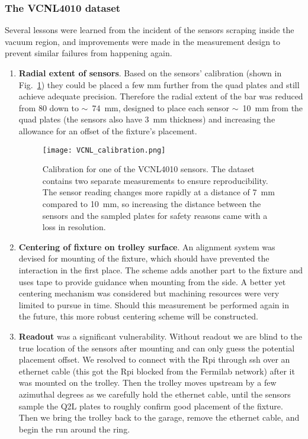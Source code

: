 \subsubsection{\label{sec:VCNL_data} The VCNL4010 dataset}


Several lessons were learned from the incident of the sensors scraping inside the vacuum region, and improvements were made in the measurement design to prevent similar failures from happening again.
\begin{enumerate}
\item \textbf{Radial extent of sensors}. Based on the sensors' calibration (shown in Fig.~\ref{fig:VCNL_calibration}) they could be placed a few mm further from the quad plates and still achieve adequate precision. Therefore the radial extent of the bar was reduced from 80 down to $\sim$~\SI{74}{mm}, designed to place each sensor $\sim$~\SI{10}{mm} from the quad plates (the sensors also have \SI{3}{mm} thickness) and increasing the allowance for an offset of the fixture's placement.


\begin{figure}[]
	\centering
	\texttt{[image: VCNL\_calibration.png]}
	\caption{Calibration for one of the VCNL4010 sensors. The dataset contains two separate measurements to ensure reproducibility. The sensor reading changes more rapidly at a distance of \SI{7}{mm} compared to \SI{10}{mm}, so increasing the distance between the sensors and the sampled plates for safety reasons came with a loss in resolution.
	}\label{fig:VCNL_calibration}
\end{figure}


\item \textbf{Centering of fixture on trolley surface}. An alignment system was devised for mounting of the fixture, which should have prevented the interaction in the first place. The scheme adds another part to the fixture and uses tape to provide guidance when mounting from the side. A better yet centering mechanism was considered but machining resources were very limited to pursue in time. Should this measurement be performed again in the future, this more robust centering scheme will be constructed.

\item \textbf{Readout} was a significant vulnerability. Without readout we are blind to the true location of the sensors after mounting and can only guess the potential placement offset. We resolved to connect with the Rpi through ssh over an ethernet cable (this got the Rpi blocked from the Fermilab network) after it was mounted on the trolley. Then the trolley moves upstream by a few azimuthal degrees as we carefully hold the ethernet cable, until the sensors sample the Q2L plates to roughly confirm good placement of the fixture. Then we bring the trolley back to the garage, remove the ethernet cable, and begin the run around the ring. 
\end{enumerate}




